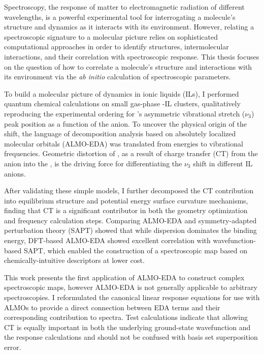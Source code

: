 \documentclass[%
  class = article,%
  crop = false,%
  float = true,%
  multi = true,%
  preview = false,%
]{standalone}
\begin{document}
\onlyifstandalone{\maketitle}
Spectroscopy, the response of matter to electromagnetic radiation of different wavelengths, is a powerful experimental tool for interrogating a molecule's structure and dynamics as it interacts with its environment. However, relating a spectroscopic signature to a molecular picture relies on sophisticated computational approaches in order to identify structures, intermolecular interactions, and their correlation with spectroscopic response. This thesis focuses on the question of how to correlate a molecule's structure and interactions with its environment via the \textit{ab initio} calculation of spectroscopic parameters.

To build a molecular picture of  dynamics in ionic liquids (ILs), I performed quantum chemical calculations on small gas-phase -IL clusters, qualitatively reproducing the experimental ordering for 's asymmetric vibrational stretch (\(\nu_3\)) peak position as a function of the anion. To uncover the physical origin of the shift, the language of decomposition analysis based on absolutely localized molecular orbitals (ALMO-EDA) was translated from energies to vibrational frequencies. Geometric distortion of , as a result of charge transfer (CT) from the anion into the , is the driving force for differentiating the  \(\nu_3\) shift in different IL anions.

After validating these simple models, I further decomposed the CT contribution into equilibrium structure and potential energy surface curvature mechanisms, finding that CT is a significant contributor in both the geometry optimization and frequency calculation steps. Comparing ALMO-EDA and symmetry-adapted perturbation theory (SAPT) showed that while dispersion dominates the binding energy, DFT-based ALMO-EDA showed excellent correlation with wavefunction-based SAPT, which enabled the construction of a spectroscopic map based on chemically-intuitive descriptors at lower cost.

This work presents the first application of ALMO-EDA to construct complex spectroscopic maps, however ALMO-EDA is not generally applicable to arbitrary spectroscopies. I reformulated the canonical linear response equations for use with ALMOs to provide a direct connection between EDA terms and their corresponding contribution to spectra. Test calculations indicate that allowing CT is equally important in both the underlying ground-state wavefunction and the response calculations and should not be confused with basis set superposition error.
\end{document}

